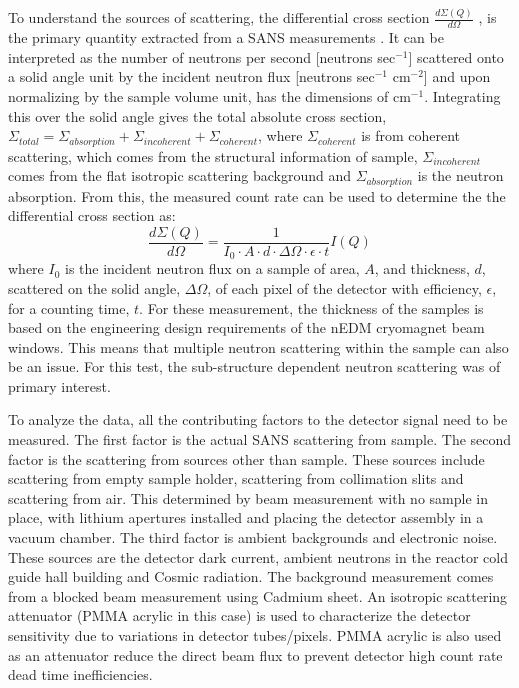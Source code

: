 To understand the sources of scattering, the differential cross section $\frac{d\Sigma(Q)}{d\Omega}$ , is the primary quantity extracted from a SANS measurements \cite{Pynn1990, Hammouda2008, Feigin2013, Glinka2004}. It can be interpreted as the number of neutrons per second [neutrons sec$^{-1}$] scattered onto a solid angle unit by the incident neutron flux [neutrons  sec$^{-1}$ cm$^{-2}$] and upon normalizing by the sample volume unit, has the dimensions of cm$^{-1}$. Integrating this over the solid angle gives the total absolute cross section, $\Sigma_{total} = \Sigma_{absorption} + \Sigma_{incoherent} + \Sigma_{coherent}$, where $\Sigma_{coherent}$ is from coherent scattering, which comes from the structural information of sample, $\Sigma_{incoherent}$ comes from the flat isotropic scattering background and $\Sigma_{absorption}$ is the neutron absorption. From this, the measured count rate can be used to determine the the differential cross section as:
\begin{equation}
    \frac{d\Sigma(Q)}{d\Omega} = \frac{1}{ I_0 \cdot A \cdot d \cdot \Delta \Omega \cdot \epsilon \cdot t} I(Q)
\end{equation}
where $I_0$ is the incident neutron flux on a sample of area, $A$, and thickness, $d$, scattered on the solid angle, $\Delta \Omega$, of each pixel of the detector with efficiency, $\epsilon$, for a counting time, $t$. For these measurement, the thickness of the samples is based on the engineering design requirements of the nEDM cryomagnet beam windows. This means that multiple neutron scattering within the sample can also be an issue. For this test, the sub-structure dependent neutron scattering was of primary interest.

To analyze the data, all the contributing factors to the detector signal need to be measured. The first factor is the actual SANS scattering from sample. The second factor is the scattering from sources other than sample. These sources include scattering from empty sample holder, scattering from collimation slits and scattering from air. This determined by beam measurement with no sample in place, with lithium apertures installed and placing the detector assembly in a vacuum chamber. The third factor is ambient backgrounds and electronic noise. These sources are the detector dark current, ambient neutrons in the reactor cold guide hall building and Cosmic radiation. The background measurement comes from a blocked beam measurement using Cadmium sheet. An isotropic scattering attenuator (PMMA acrylic in this case) is used to characterize the detector sensitivity due to variations in detector tubes/pixels. PMMA acrylic is also used as an attenuator reduce the direct beam flux to prevent detector high count rate dead time inefficiencies. 


